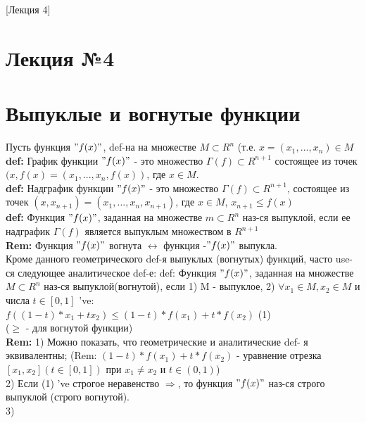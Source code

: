 [Лекция 4]

\newpage

\section*{Лекция №4}
\section*{Выпуклые и вогнутые функции}

Пусть функция $"f(x)"$, def-на на множестве $M \subset R^n$ (т.е. $x = (x_1, ... , x_n) \in M$ \\

\textbf{def:} График функции $"f(x)"$  - это множество $\Gamma(f) \subset R^{n+1}$ состоящее из точек $(x, f(x) = (x_1, ... , x_n, f(x))$, где $x \in M$. \\

\textbf{def:} Надграфик функции $"f(x)"$  - это множество $\Gamma(f) \subset R^{n+1}$, состоящее из точек $(x, x_{n+1}) = (x_1, ..., x_n, x_{n+1})$, где $x \in M$, $x_{n+1} \leqslant f(x)$ \\

\textbf{def:} Функция $"f(x)"$, заданная на множестве $m \subset R^n$ наз-ся выпуклой, если ее надграфик $\Gamma(f)$ является выпуклым множеством в $R^{n+1}$ \\

\textbf{Rem:} Функция $"f(x)"$ вогнута $\leftrightarrow$ функция -$"f(x)"$ выпукла. \\

Кроме данного геометрического def-я выпуклых (вогнутых) функций, часто use-ся следующее аналитическое def-е:
def: Функция $"f(x)"$, заданная на множестве $M \subset R^n$ наз-ся выпуклой(вогнутой), если 1) M - выпуклое, 2) $\forall x_1 \in M, x_2 \in M$ и числа $t \in [0,1]$ 've:\\
$f((1-t)*x_1+tx_2) \leqslant (1-t)*f(x_1) + t * f(x_2)$ (1) \\
($\geqslant$ - для вогнутой функции) \\

\textbf{Rem:} 1) Можно показать, что геометрические и аналитические def- я эквивалентны; (Rem: $(1-t)*f(x_1) + t * f(x_2)$ - уравнение отрезка $[x_1, x_2] (t \in [0, 1])$ при $x_1 \neq x_2$ и $t \in (0,1)$)\\
2) Если (1) 've строгое неравенство $\Rightarrow$, то функция $"f(x)"$ наз-ся строго выпуклой (строго вогнутой). \\
3) 
